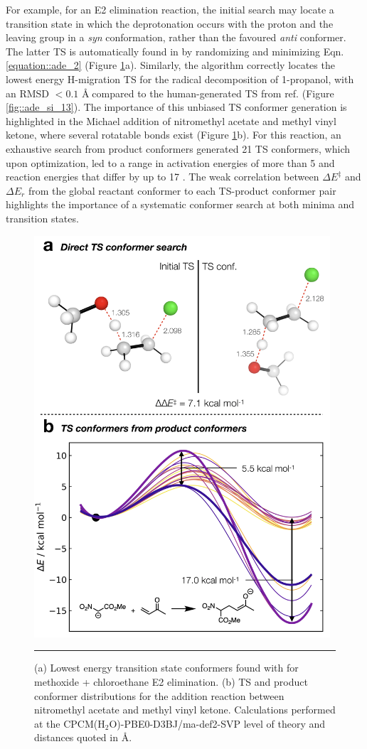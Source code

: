 \documentclass[../../main.tex]{subfiles}
\begin{document}
For example, for an E2 elimination reaction, the initial search may locate a transition state in which the deprotonation occurs with the proton and the leaving group in a \emph{syn} conformation, rather than the favoured \emph{anti} conformer. The latter TS is automatically found in \ade by randomizing and minimizing Eqn. \eqref{equation::ade_2} (Figure \ref{fig::ade_6}a). Similarly, the \ade algorithm correctly locates the lowest energy H-migration TS for the radical decomposition of 1-propanol, with an RMSD $< 0.1$ \AA$\;$compared to the human-generated TS from ref. \cite{Ferro-Costas2018} (Figure \ref{fig::ade_si_13}). The importance of this unbiased TS conformer generation is highlighted in the Michael addition of nitromethyl acetate and methyl vinyl ketone, where several rotatable bonds exist (Figure \ref{fig::ade_6}b). For this reaction, an exhaustive search from product conformers generated 21 TS conformers, which upon optimization, led to a range in activation energies of more than 5 \kcalx and reaction energies that differ by up to 17 \kcal. The weak correlation between $\Delta E^\ddagger$ and $\Delta E_r$ from the global reactant conformer to each TS-product conformer pair highlights the importance of a systematic conformer search at both minima and transition states.


\begin{figure}[h!]
	\vspace{0.4cm}
	\centering
	\includegraphics[width=11cm]{5/autode/figs/fig6}
	\vspace{0.4cm}
	\hrule
	\caption{(a) Lowest energy transition state conformers found with \ade for methoxide + chloroethane E2 elimination. (b) TS and product conformer distributions for the addition reaction between nitromethyl acetate and methyl vinyl ketone. Calculations performed at the CPCM(H$_2$O)-PBE0-D3BJ/ma-def2-SVP level of theory and distances quoted in \AA.}
	\label{fig::ade_6}
\end{figure}
\end{document}
